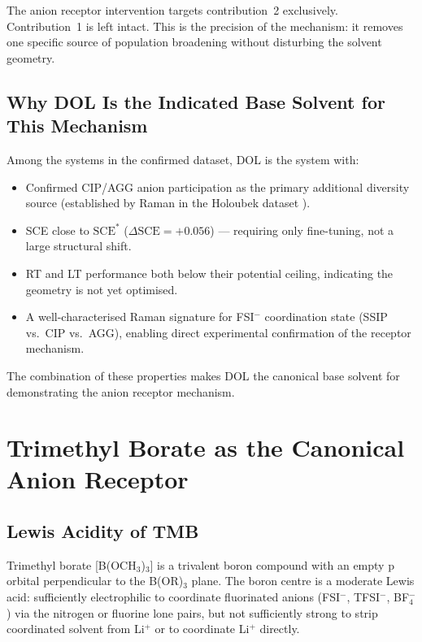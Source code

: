 \documentclass[11pt]{article}
\theoremstyle{plain}
\theoremstyle{definition}
\theoremstyle{remark}
\begin{document}
The anion receptor intervention targets contribution~2 exclusively.
Contribution~1 is left intact.  This is the precision of the mechanism:
it removes one specific source of population broadening without
disturbing the solvent geometry.

\subsection{Why DOL Is the Indicated Base Solvent for This Mechanism}

Among the systems in the confirmed dataset, DOL is the system with:
\begin{itemize}[leftmargin=2em]
  \item Confirmed CIP/AGG anion participation as the primary
        additional diversity source (established by Raman in the
        Holoubek dataset \cite{Holoubek2021}).
  \item SCE close to $\mathrm{SCE}^{*}$ ($\Delta\mathrm{SCE} = +0.056$)
        --- requiring only fine-tuning, not a large structural shift.
  \item RT and LT performance both below their potential ceiling,
        indicating the geometry is not yet optimised.
  \item A well-characterised Raman signature for FSI$^-$ coordination
        state (SSIP vs.\ CIP vs.\ AGG), enabling direct experimental
        confirmation of the receptor mechanism.
\end{itemize}

The combination of these properties makes DOL the canonical base solvent
for demonstrating the anion receptor mechanism.

\section{Trimethyl Borate as the Canonical Anion Receptor}
\label{sec:TMB}

\subsection{Lewis Acidity of TMB}

Trimethyl borate [B(OCH$_3$)$_3$] is a trivalent boron compound with an
empty p orbital perpendicular to the B(OR)$_3$ plane.  The boron centre
is a moderate Lewis acid: sufficiently electrophilic to coordinate
fluorinated anions (FSI$^-$, TFSI$^-$, BF$_4^-$) via the nitrogen
or fluorine lone pairs, but not sufficiently strong to strip coordinated
solvent from Li$^+$ or to coordinate Li$^+$ directly.
\end{document}
